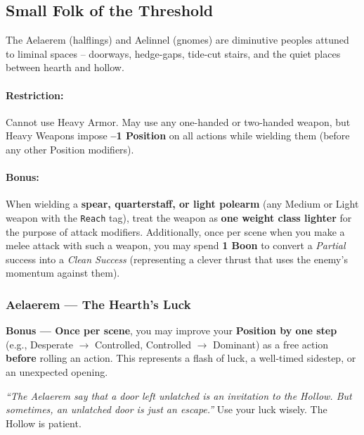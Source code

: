 \subsection{Small Folk of the Threshold}
\label{sec:small-folk-detailed}

The Aelaerem (halflings) and Aelinnel (gnomes) are diminutive peoples attuned to liminal spaces -- doorways, hedge-gaps, tide-cut stairs, and the quiet places between hearth and hollow.

\paragraph{Restriction:} Cannot use Heavy Armor. May use any one-handed or two-handed weapon, but Heavy Weapons impose \textbf{--1 Position} on all actions while wielding them (before any other Position modifiers).

\paragraph{Bonus:} When wielding a \textbf{spear, quarterstaff, or light polearm} (any Medium or Light weapon with the \texttt{Reach} tag), treat the weapon as \textbf{one weight class lighter} for the purpose of attack modifiers. Additionally, once per scene when you make a melee attack with such a weapon, you may spend \textbf{1 Boon} to convert a \textit{Partial} success into a \textit{Clean Success} (representing a clever thrust that uses the enemy's momentum against them).

\subsubsection{Aelaerem --- The Hearth's Luck}
\label{sec:aelaerem-racial-detailed}
\textbf{Bonus --- Once per scene}, you may improve your \textbf{Position by one step} (e.g., Desperate $\rightarrow$ Controlled, Controlled $\rightarrow$ Dominant) as a free action \textbf{before} rolling an action. This represents a flash of luck, a well-timed sidestep, or an unexpected opening.

\begin{tcolorbox}[colback=green!5!white,colframe=green!70!black,title=From the Hearth Cycle,breakable]
\emph{``The Aelaerem say that a door left unlatched is an invitation to the Hollow. But sometimes, an unlatched door is just an escape.''}  
Use your luck wisely. The Hollow is patient.
\end{tcolorbox}

